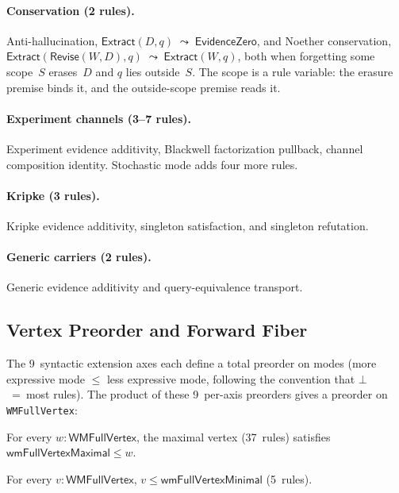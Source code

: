 \documentclass[11pt,openany]{report}
\begin{document}
\paragraph{Conservation (2 rules).}
Anti-hallucination, $\mathsf{Extract}(D, q) \;\leadsto\; \mathsf{EvidenceZero}$,
and Noether conservation,
$\mathsf{Extract}(\mathsf{Revise}(W, D), q) \;\leadsto\; \mathsf{Extract}(W, q)$,
both when forgetting some scope~$S$ erases~$D$ and $q$ lies outside~$S$.
The scope is a rule variable: the erasure premise binds it, and the
outside-scope premise reads it.

\paragraph{Experiment channels (3--7 rules).}
Experiment evidence additivity, Blackwell factorization pullback, channel
composition identity.  Stochastic mode adds four more rules.

\paragraph{Kripke (3 rules).}
Kripke evidence additivity, singleton satisfaction, and singleton refutation.

\paragraph{Generic carriers (2 rules).}
Generic evidence additivity and query-equivalence transport.

\subsection{Vertex Preorder and Forward Fiber}
\label{sec:wm-vertex-preorder}

The 9~syntactic extension axes each define a total preorder on modes
(more expressive mode $\le$ less expressive mode, following the convention
that $\bot$~=~most rules).  The product of these 9~per-axis preorders
gives a preorder on \texttt{WMFullVertex}:

\begin{theorem}
For every $w : \mathsf{WMFullVertex}$, the maximal vertex (37~rules)
satisfies $\mathsf{wmFullVertexMaximal} \le w$.
\end{theorem}

\begin{theorem}
For every $v : \mathsf{WMFullVertex}$, $v \le \mathsf{wmFullVertexMinimal}$
(5~rules).
\end{theorem}
\end{document}
